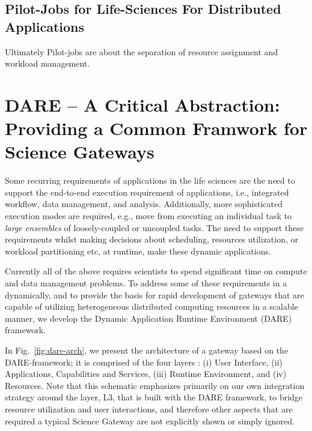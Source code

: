 \documentclass[]{article}
\begin{document}



\subsection{Pilot-Jobs for Life-Sciences For Distributed Applications}

Ultimately Pilot-jobs are about the separation of resource assignment and
workload management.


\section{DARE -- A Critical Abstraction: Providing a Common Framwork
  for Science Gateways}

Some recurring requirements of applications in the life sciences are
the need to support the end-to-end execution requirement of
applications, i.e., integrated workflow, data management, and
analysis.  Additionally, more sophisticated execution modes are
required, e.g., move from executing an individual task to
\textit{large ensembles} of loosely-coupled or uncoupled tasks. The
need to support these requirements whilst making decisions about
scheduling, resources utilization, or workload partitioning etc, at
runtime, make these dynamic applications.

Currently all of the above requires scientists to spend significant
time on compute and data management problems.  To address some of
these requirements in a dynamically, and to provide the basis for
rapid development of gateways that are capable of utilizing
heterogeneous distributed computing resources in a scalable manner, we
develop the Dynamic Application Runtime Environment (DARE)
framework\cite{dareurl}.

In Fig.~\ref{fig:dare-arch}, we present the architecture of a gateway
based on the DARE-framework; it is comprised of the four
layers : (i) User Interface, (ii) Applications, Capabilities and Services,
(iii) Runtime Environment, and (iv) Resources.  Note that this schematic emphasizes primarily on our own integration strategy around the layer, L3, that is built with the DARE framework, to bridge resource utilization and user interactions, and therefore other aspects that are required a typical Science Gateway are not explicitly shown or simply ignored.   
\end{document}
